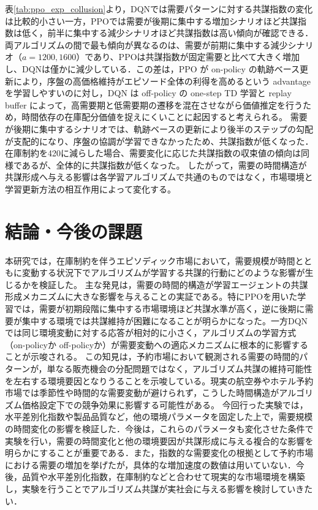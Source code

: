 \documentclass[runningheads]{llncs}
\begin{document}
表\ref{tab:ppo_exp_collusion}より，DQNでは需要パターンに対する共謀指数の変化は比較的小さい一方，PPOでは需要が後期に集中する増加シナリオほど共謀指数は低く，前半に集中する減少シナリオほど共謀指数は高い傾向が確認できる．両アルゴリズムの間で最も傾向が異なるのは、需要が前期に集中する減少シナリオ（$a=1200,1600$）であり、PPOは共謀指数が固定需要と比べて大きく増加し、DQNは僅かに減少している．この差は，PPO が on-policy の軌跡ベース更新により，序盤の高価格維持がエピソード全体の利得を高めるという advantage を学習しやすいのに対し，DQN は off-policy の one-step TD 学習と replay buffer によって，高需要期と低需要期の遷移を混在させながら価値推定を行うため，時間依存の在庫配分価値を捉えにくいことに起因すると考えられる。
需要が後期に集中するシナリオでは、軌跡ベースの更新により後半のステップの勾配が支配的になり、序盤の協調が学習できなかったため、共謀指数が低くなった．在庫制約を420に減らした場合、需要変化に応じた共謀指数の収束値の傾向は同様であるが、全体的に共謀指数が低くなった。
したがって，需要の時間構造が共謀形成へ与える影響は各学習アルゴリズムで共通のものではなく，市場環境と学習更新方法の相互作用によって変化する。


\section{結論・今後の課題}

本研究では，在庫制約を伴うエピソディック市場において，需要規模が時間とともに変動する状況下でアルゴリズムが学習する共謀的行動にどのような影響が生じるかを検証した。
主な発見は，需要の時間的構造が学習エージェントの共謀形成メカニズムに大きな影響を与えることの実証である。特にPPOを用いた学習では，需要が初期段階に集中する市場環境ほど共謀水準が高く，逆に後期に需要が集中する環境では共謀維持が困難になることが明らかになった。一方DQNでは同じ環境変動に対する応答が相対的に小さく，アルゴリズムの学習方式（on-policyか off-policyか）が需要変動への適応メカニズムに根本的に影響することが示唆される。
この知見は，予約市場において観測される需要の時間的パターンが，単なる販売機会の分配問題ではなく，アルゴリズム共謀の維持可能性を左右する環境要因となりうることを示唆している。現実の航空券やホテル予約市場では季節性や時間的な需要変動が避けられず，こうした時間構造がアルゴリズム価格設定下での競争効果に影響する可能性がある。
今回行った実験では，水平差別化指数や製品品質など，他の環境パラメータを固定した上で，需要規模の時間変化の影響を検証した．今後は，これらのパラメータも変化させた条件で実験を行い，需要の時間変化と他の環境要因が共謀形成に与える複合的な影響を明らかにすることが重要である．また，指数的な需要変化の根拠として予約市場における需要の増加を挙げたが，具体的な増加速度の数値は用いていない．今後，品質や水平差別化指数，在庫制約などと合わせて現実的な市場環境を構築し，実験を行うことでアルゴリズム共謀が実社会に与える影響を検討していきたい．






\end{document}
